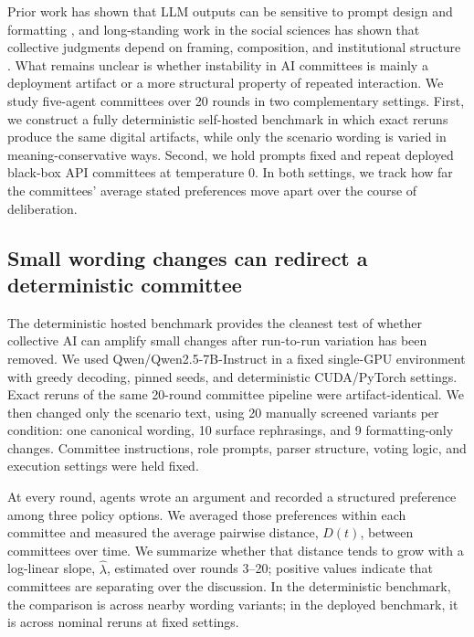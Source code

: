 \documentclass[12pt]{article}
\newcommand{\lam}{\ensuremath{\hat{\lambda}}}
\begin{document}
Prior work has shown that LLM outputs can be sensitive to prompt design and
formatting \cite{sclar2023quantifying}, and long-standing work in the social
sciences has shown that collective judgments depend on framing, composition, and
institutional structure \cite{sunstein2002law,tversky1981framing,page2007difference}.
What remains unclear is whether instability in AI committees is mainly a
deployment artifact or a more structural property of repeated interaction. We
study five-agent committees over 20 rounds in two complementary settings. First,
we construct a fully deterministic self-hosted benchmark in which exact reruns
produce the same digital artifacts, while only the scenario wording is varied in
meaning-conservative ways. Second, we hold prompts fixed and repeat deployed
black-box API committees at temperature 0. In both settings, we track how far
the committees' average stated preferences move apart over the course of
deliberation.

\subsection*{Small wording changes can redirect a deterministic committee}

The deterministic hosted benchmark provides the cleanest test of whether
collective AI can amplify small changes after run-to-run variation has been
removed. We used Qwen/Qwen2.5-7B-Instruct in a fixed single-GPU environment
with greedy decoding, pinned seeds, and deterministic CUDA/PyTorch settings.
Exact reruns of the same 20-round committee pipeline were artifact-identical.
We then changed only the scenario text, using 20 manually screened variants per
condition: one canonical wording, 10 surface rephrasings, and 9 formatting-only
changes. Committee instructions, role prompts, parser structure, voting logic,
and execution settings were held fixed.

At every round, agents wrote an argument and recorded a structured preference
among three policy options. We averaged those preferences within each committee
and measured the average pairwise distance, $D(t)$, between committees over
time. We summarize whether that distance tends to grow with a log-linear slope,
$\lam$, estimated over rounds 3--20; positive values indicate that committees
are separating over the discussion. In the deterministic benchmark, the
comparison is across nearby wording variants; in the deployed benchmark, it is
across nominal reruns at fixed settings.
\end{document}
